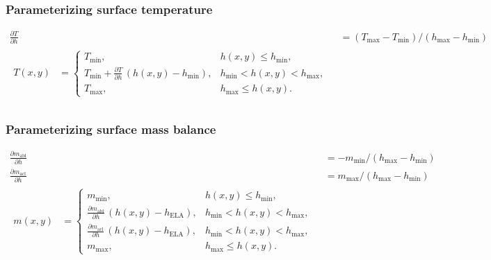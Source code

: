 \documentclass[hide notes,intlimits]{beamer}
\newcommand{\diff}[2]{\frac{\partial #1}{\partial #2}}
\begin{document}
\newcommand{\var}[2]{ {#1}_{\text{#2}} }
\newcommand{\h}[1]{ \var{h}{#1} }
\newcommand{\T}[1]{ \var{T}{#1} }
\newcommand{\m}[1]{ \var{m}{#1} }

\begin{frame}
  \frametitle{Parameterizing surface temperature}
  \begin{align*}
    \diff{T}{h} &= (\T{max} - \T{min}) / (\h{max} - \h{min})\\
    \begin{split}T(x,y) &=
      \begin{cases}
        \T{min}, & h(x,y) \le \h{min}, \\
        \T{min} + \diff{T}{h} \, (h(x,y) - \h{min}), & \h{min} < h(x,y) < \h{max}, \\
        \T{max}, & \h{max} \le h(x,y).
      \end{cases}
    \end{split}\\
  \end{align*}
\end{frame}

 \begin{frame}
  \frametitle{Parameterizing surface mass balance}
  \begin{align*}
    \diff{\m{abl}}{h} &= -\m{min} / (\h{max} - \h{min})\\
    \diff{\m{acl}}{h} &= \m{max} / (\h{max} - \h{min})\\
    \begin{split}m(x,y) &=
      \begin{cases}
        \m{min}, & h(x,y) \le \h{min}, \\
        \diff{\m{abl}}{h} \, (h(x,y) - h_{\text{ELA}}), &  \h{min} < h(x,y) < \h{max}, \\
        \diff{\m{acl}}{h} \, (h(x,y) - h_{\text{ELA}}), & \h{min} < h(x,y) < \h{max}, \\
        \m{max}, & \h{max} \le h(x,y).
      \end{cases}\end{split}
  \end{align*}
\end{frame}
\end{document}
